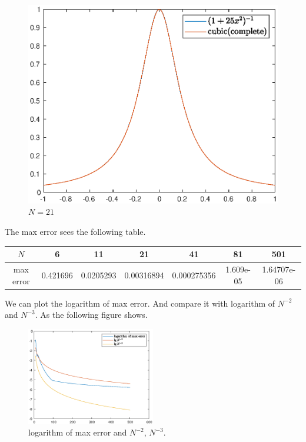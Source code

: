 \documentclass[11pt,en]{elegantpaper}
\begin{document}
\begin{figure}[htbp]
\begin{minipage}[t]{0.33\linewidth}
        \caption{$N=11$}
        \label{fig:side:b}
    \end{minipage}
    \begin{minipage}[t]{0.33\linewidth}
        \centering
        \includegraphics[width=0.95\linewidth]{figure/assA_N=21.eps}
        \caption{$N=21$}
        \label{fig:side:c}
    \end{minipage}%
\end{figure}

The max error sees the following table.

\begin{table}[htbp]
    \centering
    \begin{tabular}{c|cccccc}
    \textbf{$N$} & 6        & 11        & 21         & 41          & 81        & 501         \\ \hline
    max error    & 0.421696 & 0.0205293 & 0.00316894 & 0.000275356 & 1.609e-05 & 1.64707e-06
    \end{tabular}
\end{table}

We can plot the logarithm of max error. And compare it with logarithm of $N^{-2}$ and $N^{-3}$. As the following figure shows.

\begin{figure}[htbp]
    \centering
    \includegraphics[width=0.5\textwidth]{figure/maxerr_log.eps}
    \caption{logarithm of max error and $N^{-2}$, $N^{-3}$.}
\end{figure}
\end{document}
